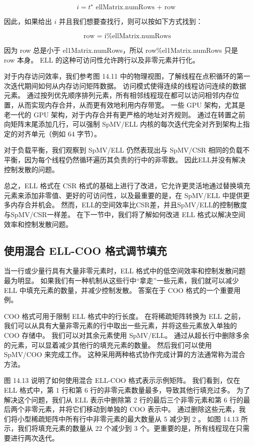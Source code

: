 $$
i=t^{\star} \text { ellMatrix.numRows + row }
$$

因此，如果给出 $i$ 并且我们想要查找行，则可以按如下方式找到：

$$
\text { row }=\text { i\%ellMatrix.numRows }
$$

因为 row 总是小于 el1Matrix.numRows，所以 row\%el1Matrix.numRows 只是 row 本身。 ELL 的这种可访问性允许跨行以及非零元素并行化。

对于内存访问效率，我们参考图 14.11 中的物理视图，了解线程在点积循环的第一次迭代期间如何从内存访问矩阵数据。 访问模式使得连续的线程访问连续的数据元素。 通过按列优先顺序排列元素，所有相邻线程现在都可以访问相邻内存位置，从而实现内存合并，从而更有效地利用内存带宽。 一些 GPU 架构，尤其是老一代的 GPU 架构，对于内存合并有更严格的地址对齐规则。 通过在转置之前向矩阵末尾添加几行，可以强制 SpMV/ELL 内核的每次迭代完全对齐到架构上指定的对齐单元（例如 64 字节）。

对于负载平衡，我们观察到 SpMV/ELL 仍然表现出与 SpMV/CSR 相同的负载不平衡，因为每个线程仍然循环遍历其负责的行中的非零数。 因此ELL并没有解决控制发散的问题。

总之，ELL 格式在 CSR 格式的基础上进行了改进，它允许更灵活地通过替换填充元素来添加非零值、更好的可访问性，以及最重要的是，在 SpMV/ELL 中提供更多内存合并机会。 然而，ELL的空间效率比CSR差，并且SpMV/ELL的控制散度与SpMV/CSR一样差。 在下一节中，我们将了解如何改进 ELL 格式以解决空间效率和控制发散问题。

\subsection{使用混合 ELL-COO 格式调节填充}
当一行或少量行具有大量非零元素时，ELL 格式中的低空间效率和控制发散问题最为明显。 如果我们有一种机制从这些行中“拿走”一些元素，我们就可以减少 ELL 中填充元素的数量，并减少控制发散。 答案在于 $\mathrm{COO}$ 格式的一个重要用例。

COO 格式可用于限制 ELL 格式中的行长度。 在将稀疏矩阵转换为 ELL 之前，我们可以从具有大量非零元素的行中取出一些元素，并将这些元素放入单独的 COO 存储中。 我们可以对其余元素使用 SpMV/ELL。 通过从超长行中删除多余的元素，可以显着减少其他行的填充元素的数量。 然后我们可以使用 SpMV/COO 来完成工作。 这种采用两种格式协作完成计算的方法通常称为混合方法。

图 14.13 说明了如何使用混合 ELL-COO 格式表示示例矩阵。 我们看到，仅在 ELL 格式中，第 1 行和第 6 行的非零元素数量最多，导致其他行填充过多。 为了解决这个问题，我们从 ELL 表示中删除第 2 行的最后三个非零元素和第 6 行的最后两个非零元素，并将它们移动到单独的 $\mathrm{COO}$ 表示中。 通过删除这些元素，我们将小型稀疏矩阵中所有行中非零元素的最大数量从 5 减少到 2 。 如图 14.13 所示，我们将填充元素的数量从 22 个减少到 3 个。更重要的是，所有线程现在只需要进行两次迭代。

